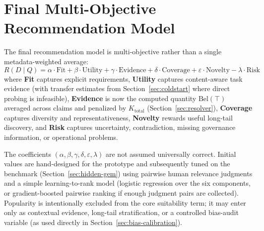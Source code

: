 \documentclass[11pt]{article}
\begin{document}
\section{Final Multi-Objective Recommendation Model}
\label{sec:ranking-model}
The final recommendation model is multi-objective rather than a single metadata-weighted average:
\begin{equation}
R(D \mid Q) = \alpha \cdot \mathrm{Fit} + \beta \cdot \mathrm{Utility} + \gamma \cdot \mathrm{Evidence}
  + \delta \cdot \mathrm{Coverage} + \varepsilon \cdot \mathrm{Novelty} - \lambda \cdot \mathrm{Risk}
\end{equation}
where \textbf{Fit} captures explicit requirements, \textbf{Utility} captures content-aware task evidence
(with transfer estimates from Section~\ref{sec:coldstart} where direct probing is infeasible),
\textbf{Evidence} is now the computed quantity $\mathrm{Bel}(\top)$ averaged across claims and penalized
by $K_{\text{total}}$ (Section~\ref{sec:resolver}), \textbf{Coverage} captures diversity and
representativeness, \textbf{Novelty} rewards useful long-tail discovery, and \textbf{Risk} captures
uncertainty, contradiction, missing governance information, or operational problems.

The coefficients $(\alpha,\beta,\gamma,\delta,\varepsilon,\lambda)$ are not assumed universally correct.
Initial values are hand-designed for the prototype and subsequently tuned on the benchmark
(Section~\ref{sec:hidden-gem}) using pairwise human relevance judgments and a simple learning-to-rank
model (logistic regression over the six components, or gradient-boosted pairwise ranking if enough
judgment pairs are collected). Popularity is intentionally excluded from the core suitability term; it may
enter only as contextual evidence, long-tail stratification, or a controlled bias-audit variable (as used
directly in Section~\ref{sec:bias-calibration}).

\end{document}
